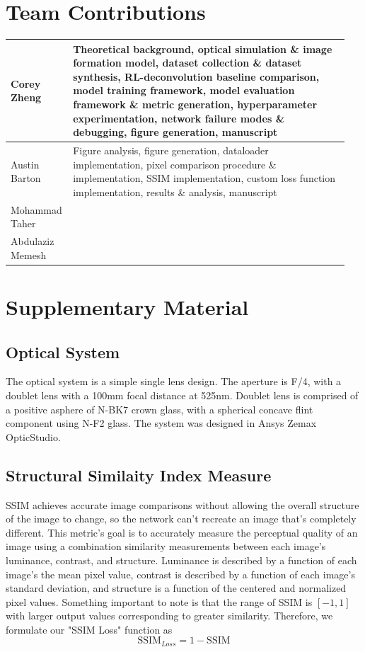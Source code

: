 \documentclass{article}
\begin{document}
\section{Team Contributions}
\begin{tabular}{p{0.15\linewidth} | p{0.8\linewidth}}
    \toprule
    Corey Zheng & Theoretical background, optical simulation \& image formation model, dataset collection \& dataset synthesis, RL-deconvolution baseline comparison, model training framework, model evaluation framework \& metric generation, hyperparameter experimentation, network failure modes \& debugging, figure generation, manuscript\\
    \midrule
    Austin Barton & Figure analysis, figure generation, dataloader implementation, pixel comparison procedure \& implementation, SSIM implementation, custom loss function implementation, results \& analysis, manuscript \\
    \midrule
    Mohammad Taher & \\
    \midrule
    Abdulaziz Memesh & \\
    \bottomrule
\end{tabular}




\newpage
\appendix
\section{Supplementary Material}
\label{sec:appendix}
\subsection{Optical System}
\label{sec:appendixOptical}
The optical system is a simple single lens design. The aperture is F/4, with a doublet lens with a 100mm focal distance at 525nm. Doublet lens is comprised of a positive asphere of N-BK7 crown glass, with a spherical concave flint component using N-F2 glass. The system was designed in Ansys Zemax OpticStudio.

\subsection{Structural Similaity Index Measure}
\label{subsec:appendix_ssim}
SSIM achieves accurate image comparisons without allowing the overall structure of the image to change, so the network can't recreate an image that's completely different. This metric's goal is to accurately measure the perceptual quality of an image using a combination similarity
measurements between each image's luminance, contrast, and structure. Luminance is described by a function of each image's the mean pixel value, contrast is described by a function of each image's standard deviation, and structure is a function of the centered and normalized pixel values. Something important to note is that the range of SSIM is $[-1, 1]$ with larger output values corresponding to greater similarity. Therefore, we formulate our "SSIM Loss" function as
\begin{equation}
    \text{SSIM}_{Loss} = 1 - \text{SSIM}
\end{equation}
\end{document}
